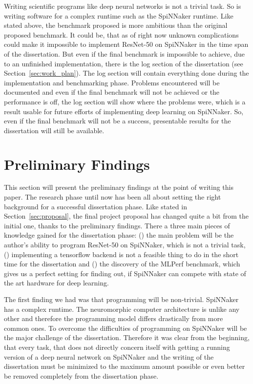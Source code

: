 \documentclass{article}
\begin{document}
Writing scientific programs like deep neural networks is
not a trivial task.
So is writing software for a complex runtime such as the
SpiNNaker runtime.
Like stated above, the benchmark proposed is more ambitious
than the original proposed benchmark.
It could be, that as of right now unknown complications
could make it impossible to implement ResNet-50 on
SpiNNaker in the time span of the dissertation.
But even if the final benchmark is impossible to achieve,
due to an unfinished implementation, there is the log
section of the dissertation (see
Section~\ref{sec:work_plan}).
The log section will contain everything done during the
implementation and benchmarking phase.
Problems encountered will be documented and even if the
final benchmark will not be achieved or the performance is
off, the log section will show where the problems were,
which is a result usable for future efforts of implementing
deep learning on SpiNNaker.
So, even if the final benchmark will not be a success,
presentable results for the dissertation will still be
available.


\section{Preliminary Findings} %
\label{sec:prelim}

This section will present the preliminary findings at the
point of writing this paper.
The research phase until now has been all about setting the
right background for a successful dissertation phase.
Like stated in Section~\ref{sec:proposal}, the final
project proposal has changed quite a bit from the initial
one, thanks to the preliminary findings.
There a three main pieces of knowledge gained for the
dissertation phase: () the main problem
will be the author's ability to program ResNet-50 on
SpiNNaker, which is not a trivial task, ()
implementing a tensorflow backend is not a feasible thing
to do in the short time for the dissertation and
() the discovery of the MLPerf benchmark,
which gives us a perfect setting for finding out, if
SpiNNaker can compete with state of the art hardware for
deep learning.

The first finding we had was that programming will be
non-trivial.
SpiNNaker has a complex runtime.
The neuromorphic computer architecture is unlike any other
and therefore the programming model differs drastically
from more common ones.
To overcome the difficulties of programming on SpiNNaker
will be the major challenge of the dissertation.
Therefore it was clear from the beginning, that every task,
that does not directly concern itself with getting a
running version of a deep neural network on
SpiNNaker and the writing of the dissertation must be
minimized to the maximum amount possible or even better be
removed completely from the dissertation phase.
\end{document}
